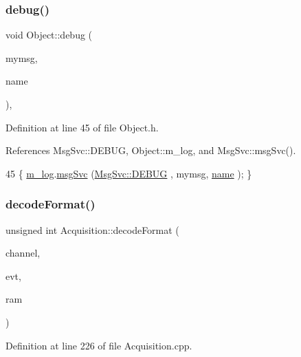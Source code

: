 \subsubsection{\texorpdfstring{debug()}{debug()}\hspace{0.1cm}{\footnotesize\ttfamily [2/2]}}
{\footnotesize\ttfamily void Object\+::debug (\begin{DoxyParamCaption}\item[{std\+::string}]{mymsg,  }\item[{std\+::string}]{name }\end{DoxyParamCaption})\hspace{0.3cm}{\ttfamily [inline]}, {\ttfamily [inherited]}}



Definition at line 45 of file Object.\+h.



References Msg\+Svc\+::\+D\+E\+B\+UG, Object\+::m\+\_\+log, and Msg\+Svc\+::msg\+Svc().


\begin{DoxyCode}
45 \{ \hyperlink{classObject_a0d269813dd7ac1f24bc143031e2963f2}{m\_log}.\hyperlink{classMsgSvc_ad25f18047920cc59a314e5098259711c}{msgSvc} (\hyperlink{classMsgSvc_ae671eb7301996cd049d2da8a65925926a1dbdcc82dce88370ec335883c83b38b0}{MsgSvc::DEBUG}   , mymsg, \hyperlink{classObject_a300f4c05dd468c7bb8b3c968868443c1}{name} ); \}
\end{DoxyCode}
\mbox{\label{classAcquisition_a76fe7c020f7097e5d479867ba783ba31}} 
\subsubsection{\texorpdfstring{decode\+Format()}{decodeFormat()}}
{\footnotesize\ttfamily unsigned int Acquisition\+::decode\+Format (\begin{DoxyParamCaption}\item[{unsigned int}]{channel,  }\item[{unsigned int}]{evt,  }\item[{\hyperlink{classRAM}{R\+AM} $\ast$}]{ram }\end{DoxyParamCaption})\hspace{0.3cm}{\ttfamily [protected]}}



Definition at line 226 of file Acquisition.\+cpp.



